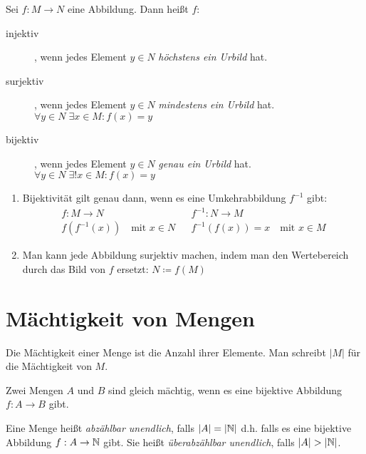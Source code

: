 Sei $f:M\rightarrow N$ eine Abbildung. Dann heißt $f$:
\begin{description}
  \item[injektiv], wenn jedes Element $y\in N$ \emph{höchstens ein Urbild} hat.
  \item[surjektiv], wenn jedes Element $y\in N$ \emph{mindestens ein Urbild} hat. $\forall y\in N\; \exists x\in M : f(x) = y$
  \item[bijektiv], wenn jedes Element $y\in N$ \emph{genau ein Urbild} hat. $\forall y\in N\; \exists! x\in M : f(x) = y$
\end{description}

\bemerkung
\begin{enumerate}
  \item Bijektivität gilt genau dann, wenn es eine Umkehrabbildung $f^{-1}$ gibt:
  \begin{align*}
    f:M\rightarrow N && f^{-1}:N\rightarrow M\\
    f\left(f^{-1}(x)\right) \quad\text{mit }x\in N && f^{-1}\left(f(x)\right)=x \quad\text{mit }x\in M
  \end{align*}
  \item Man kann jede Abbildung surjektiv machen, indem man den Wertebereich durch das Bild von $f$ ersetzt: $N\coloneqq f(M)$
\end{enumerate}

\section{Mächtigkeit von Mengen}
Die Mächtigkeit einer Menge ist die Anzahl ihrer Elemente. Man schreibt $|M|$ für die Mächtigkeit von $M$.

Zwei Mengen $A$ und $B$ sind gleich mächtig, wenn es eine bijektive Abbildung $f:A\rightarrow B$ gibt.

Eine Menge heißt \emph{abzählbar unendlich}, falls $|A|=|\mathbb{N}|$ d.h. falls es eine bijektive Abbildung $f:A\rightarrow \mathbb{N}$ gibt.
Sie heißt \emph{überabzählbar unendlich}, falls $|A|>|\N|$.



